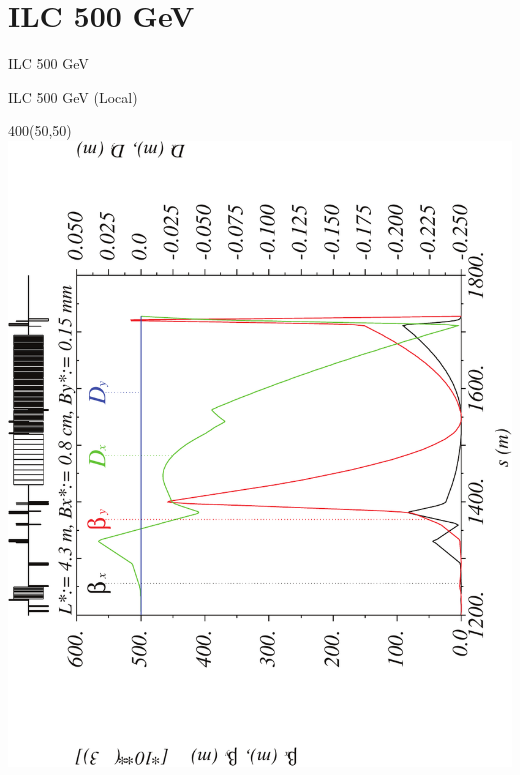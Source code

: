 \documentclass{beamer}
\begin{document}
\section{ILC 500 GeV}
\begin{frame}
 \color{blue}\Large ILC 500 GeV
\end{frame}
\begin{frame}{ILC 500 GeV (Local)}
  \setlength{\TPHorizModule}{1pt}
  \setlength{\TPVertModule}{1pt}
 \begin{textblock}{400}(50,50)
 \includegraphics[scale=0.4,angle=-90]{ILClocal_etax-crop.pdf}
 \end{textblock}
\end{frame}
\end{document}
